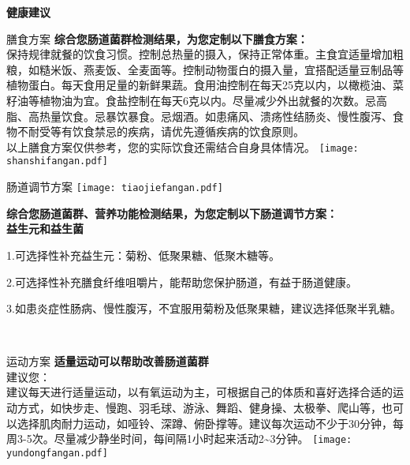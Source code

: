 

\usepackage{graphicx}
\graphicspath{{cores/}}



\setlength{\arrayrulewidth}{1pt}
\fontsize{9.3pt}{11pt}\selectfont
\color{gray2}

\centerline{\bf\sanhao 健康建议}

\vspace*{0.5mm}

\begin{LRaside}[.20]{膳食方案}
{\bf *综合您肠道菌群检测结果，为您定制以下膳食方案：}\\
{\indent 保持规律就餐的饮食习惯。控制总热量的摄入，保持正常体重。主食宜适量增加粗粮，如糙米饭、燕麦饭、全麦面等。控制动物蛋白的摄入量，宜搭配适量豆制品等植物蛋白。每天食用足量的新鲜果蔬。食用油控制在每天25克以内，以橄榄油、菜籽油等植物油为宜。食盐控制在每天6克以内。尽量减少外出就餐的次数。忌高脂、高热量饮食。忌暴饮暴食。忌烟酒。如患痛风、溃疡性结肠炎、慢性腹泻、食物不耐受等有饮食禁忌的疾病，请优先遵循疾病的饮食原则。}\\
\vspace*{0.5mm}
{\qihao *以上膳食方案仅供参考，您的实际饮食还需结合自身具体情况。}
\asidebreak %
\noindent
\texttt{[image: shanshifangan.pdf]}

\end{LRaside}


\begin{LRaside}[.70]{肠道调节方案}
\noindent
\texttt{[image: tiaojiefangan.pdf]}

\asidebreak %
{\bf *综合您肠道菌群、营养功能检测结果，为您定制以下肠道调节方案：}\\
{\bf 益生元和益生菌}\\{\indent 1.可选择性补充益生元：菊粉、低聚果糖、低聚木糖等。

2.可选择性补充膳食纤维咀嚼片，能帮助您保护肠道，有益于肠道健康。

3.如患炎症性肠病、慢性腹泻，不宜服用菊粉及低聚果糖，建议选择低聚半乳糖。}\\
\end{LRaside}

\begin{LRaside}[.20]{运动方案}
{\bf *适量运动可以帮助改善肠道菌群}\\
建议您：\\
{\indent 建议每天进行适量运动，以有氧运动为主，可根据自己的体质和喜好选择合适的运动方式，如快步走、慢跑、羽毛球、游泳、舞蹈、健身操、太极拳、爬山等，也可以选择肌肉耐力运动，如哑铃、深蹲、俯卧撑等。建议每次运动不少于30分钟，每周3-5次。尽量减少静坐时间，每间隔1小时起来活动2\textasciitilde 3分钟。}
\asidebreak %
\noindent
\texttt{[image: yundongfangan.pdf]}

\end{LRaside}



